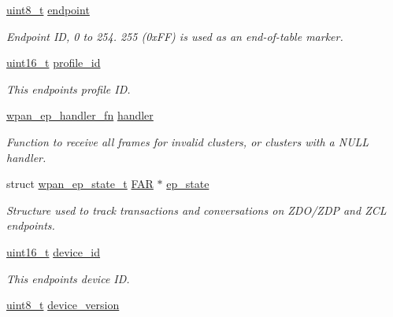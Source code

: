 \begin{DoxyCompactItemize}
\item 
\hyperlink{group__hal__dos_gae1affc9ca37cfb624959c866a73f83c2}{uint8\+\_\+t} \hyperlink{group__wpan__aps_ga7d397493728da2bca8d55b2d61c4ec5d}{endpoint}
\begin{DoxyCompactList}\small\item\em Endpoint ID, 0 to 254. 255 (0x\+FF) is used as an end-\/of-\/table marker. \end{DoxyCompactList}\item 
\hyperlink{group__hal__dos_ga5a8b2dc9e45a9ee81a94ef304fb62505}{uint16\+\_\+t} \hyperlink{group__wpan__aps_ga5ca7f19e5697de2baf0e2147a41a5792}{profile\+\_\+id}
\begin{DoxyCompactList}\small\item\em This endpoint\textquotesingle{}s profile ID. \end{DoxyCompactList}\item 
\hyperlink{group__wpan__aps_ga23d4e0e2f2137c75700dfec73b2cc80f}{wpan\+\_\+ep\+\_\+handler\+\_\+fn} \hyperlink{group__wpan__aps_ga4835da0b636ce07eedbf92aa2779a761}{handler}
\begin{DoxyCompactList}\small\item\em Function to receive all frames for invalid clusters, or clusters with a {\ttfamily N\+U\+LL} handler. \end{DoxyCompactList}\item 
struct \hyperlink{structwpan__ep__state__t}{wpan\+\_\+ep\+\_\+state\+\_\+t} \hyperlink{group__hal_gaef060b3456fdcc093a7210a762d5f2ed}{F\+AR} $\ast$ \hyperlink{group__wpan__aps_ga389966cb276b33004b14ee698c270347}{ep\+\_\+state}
\begin{DoxyCompactList}\small\item\em Structure used to track transactions and conversations on Z\+D\+O/\+Z\+DP and Z\+CL endpoints. \end{DoxyCompactList}\item 
\hyperlink{group__hal__dos_ga5a8b2dc9e45a9ee81a94ef304fb62505}{uint16\+\_\+t} \hyperlink{group__wpan__aps_gadc401e0e7465eda38f9444eeb6169a10}{device\+\_\+id}
\begin{DoxyCompactList}\small\item\em This endpoint\textquotesingle{}s device ID. \end{DoxyCompactList}\item 
\hyperlink{group__hal__dos_gae1affc9ca37cfb624959c866a73f83c2}{uint8\+\_\+t} \hyperlink{group__wpan__aps_ga0b8f4e315b56b3e3c53dea801ce92104}{device\+\_\+version}

\end{DoxyCompactItemize}
